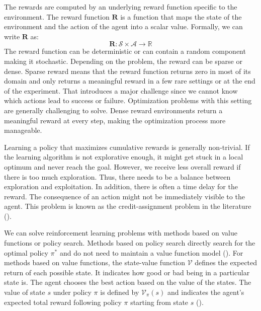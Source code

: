 The rewards are computed by an underlying reward function specific to the environment. The reward function $\mathbf{R}$ is a function that maps the state of the environment and the action of the agent into a scalar value. Formally, we can write $\mathbf{R}$ as:
\begin{equation*}
  \mathbf{R} : \mathcal{S} \times \mathcal{A} \rightarrow \mathbb{R}
\end{equation*}
The reward function can be deterministic or can contain a random component making it stochastic. Depending on the problem, the reward can be sparse or dense. Sparse reward means that the reward function returns zero in most of its domain and only returns a meaningful reward in a few rare settings or at the end of the experiment. That introduces a major challenge since we cannot know which actions lead to success or failure. Optimization problems with this setting are generally challenging to solve. Dense reward environments return a meaningful reward at every step, making the optimization process more manageable.

Learning a policy that maximizes cumulative rewards is generally non-trivial. If the learning algorithm is not explorative enough, it might get stuck in a local optimum and never reach the goal. However, we receive less overall reward if there is too much exploration. Thus, there needs to be a balance between exploration and exploitation. In addition, there is often a time delay for the reward. The consequence of an action might not be immediately visible to the agent. This problem is known as the credit-assignment problem in the literature (\cite{sutton2018reinforcement}).

We can solve reinforcement learning problems with methods based on value functions or policy search. Methods based on policy search directly search for the optimal policy $\pi^*$ and do not need to maintain a value function model (\cite{8103164}). For methods based on value functions, the state-value function $\mathcal{V}$ defines the expected return of each possible state. It indicates how good or bad being in a particular state is. The agent chooses the best action based on the value of the states. The value of state $s$ under policy $\pi$ is defined by $\mathcal{V}_\pi(s)$ and indicates the agent's expected total reward following policy $\pi$ starting from state $s$ (\cite{sutton2018reinforcement}).

